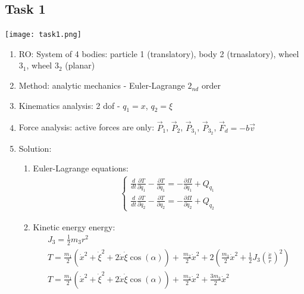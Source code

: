 \subsection*{Task 1}

\texttt{[image: task1.png]}

\begin{enumerate}
    \item RO: System of 4 bodies: particle 1 (translatory),
          body 2 (trnaslatory), wheel $3_1$, wheel $3_2$ (planar)
    \item Method: analytic mechanics - Euler-Lagrange $2_{nd}$ order
    \item Kinematics analysis: 2 dof - $q_1 = x$, $q_2 = \xi$
    \item Force analysis: active forces are only:
          $\vec{P}_1$, $\vec{P}_2$, $\vec{P}_{3_1}$, $\vec{P}_{3_2}$, $\vec{F}_d = -b \vec{v}$
    \item Solution:
          \begin{enumerate}
              \item Euler-Lagrange equations:
                    \begin{align}
                        \begin{cases}
                            \frac{d}{dt} \frac{\partial T}{\partial \dot{q}_1} - \frac{\partial T}{\partial q_1} = -\frac{\partial \Pi}{\partial q_1} + Q_{q_1}
                            \\[10pt]
                            \frac{d}{dt} \frac{\partial T}{\partial \dot{q}_2} - \frac{\partial T}{\partial q_2} = -\frac{\partial \Pi}{\partial q_2} + Q_{q_2}
                        \end{cases}
                    \end{align}
              \item Kinetic energy energy:
                    \begin{align}
                        J_3 = \frac{1}{2} m_3 r^2                                                                     \\
                        T = \frac{m_1}{2} (\dot{x}^2 + \dot{\xi}^2 + 2\dot{x}\dot{\xi} \cos(\alpha)) + \
                        \frac{m_2}{2} \dot{x}^2 + 2 (\frac{m_3}{2} \dot{x}^2 + \frac{1}{2} J_3 (\frac{\dot{x}}{r})^2) \\
                        T = \frac{m_1}{2} (\dot{x}^2 + \dot{\xi}^2 + 2\dot{x}\dot{\xi} \cos(\alpha)) + \
                        \frac{m_2}{2} \dot{x}^2 +  \frac{3 m_3}{2} \dot{x}^2
                    \end{align}

\end{enumerate}
\end{enumerate}
